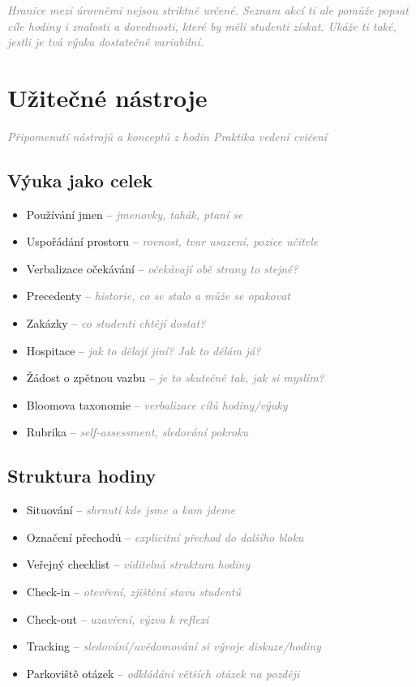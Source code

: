 \documentclass[twoside,openany]{book}
\newcommand{\note}[1]{\textcolor{gray}{\small\itshape #1}}
\begin{document}
\note{Hranice mezi úrovněmi nejsou striktně určené. Seznam akcí ti ale pomůže popsat cíle hodiny i znalosti a dovednosti, které by měli studenti získat. Ukáže ti také, jestli je tvá výuka dostatečně variabilní.}

\chapter*{Užitečné nástroje}
\vspace{-0.5em}
\note{Připomenutí nástrojů a konceptů z hodin Praktika vedení cvičení}

\section*{Výuka jako celek}

\begin{itemize}
\item Používání jmen -- \note{jmenovky, tahák, ptaní se}
\item Uspořádání prostoru -- \note{rovnost, tvar usazení, pozice učitele}
\item Verbalizace očekávání -- \note{očekávají obě strany to stejné?}
\item Precedenty -- \note{historie, co se stalo a může se opakovat}
\item Zakázky -- \note{co studenti chtějí dostat?}
\item Hospitace -- \note{jak to dělají jiní? Jak to dělám já?}
\item Žádost o zpětnou vazbu -- \note{je to skutečně tak, jak si myslím?}
\item Bloomova taxonomie -- \note{verbalizace cílů hodiny/výuky}
\item Rubrika -- \note{self-assessment, sledování pokroku}
\end{itemize}

\section*{Struktura hodiny}

\begin{itemize}
\item Situování -- \note{shrnutí kde jsme a kam jdeme}
\item Označení přechodů -- \note{explicitní přechod do dalšího bloku}
\item Veřejný checklist -- \note{viditelná struktura hodiny}
\item Check-in -- \note{otevření, zjištění stavu studentů}
\item Check-out -- \note{uzavření, výzva k reflexi}
\item Tracking -- \note{sledování/uvědomování si vývoje diskuze/hodiny}
\item Parkoviště otázek -- \note{odkládání větších otázek na později}
\end{itemize}
\end{document}
